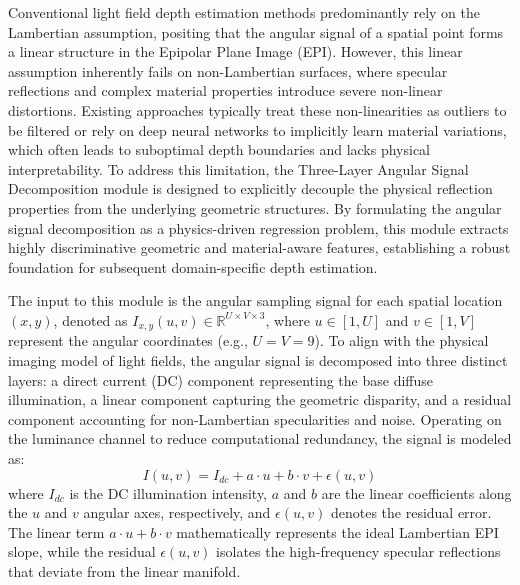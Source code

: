 \documentclass[lettersize,journal]{IEEEtran}
\begin{document}
Conventional light field depth estimation methods predominantly rely on the Lambertian assumption, positing that the angular signal of a spatial point forms a linear structure in the Epipolar Plane Image (EPI). However, this linear assumption inherently fails on non-Lambertian surfaces, where specular reflections and complex material properties introduce severe non-linear distortions. Existing approaches typically treat these non-linearities as outliers to be filtered or rely on deep neural networks to implicitly learn material variations, which often leads to suboptimal depth boundaries and lacks physical interpretability. To address this limitation, the Three-Layer Angular Signal Decomposition module is designed to explicitly decouple the physical reflection properties from the underlying geometric structures. By formulating the angular signal decomposition as a physics-driven regression problem, this module extracts highly discriminative geometric and material-aware features, establishing a robust foundation for subsequent domain-specific depth estimation.

The input to this module is the angular sampling signal for each spatial location $(x,y)$, denoted as $I_{x,y}(u,v) \in \mathbb{R}^{U \times V \times 3}$, where $u \in [1, U]$ and $v \in [1, V]$ represent the angular coordinates (e.g., $U=V=9$). To align with the physical imaging model of light fields, the angular signal is decomposed into three distinct layers: a direct current (DC) component representing the base diffuse illumination, a linear component capturing the geometric disparity, and a residual component accounting for non-Lambertian specularities and noise. Operating on the luminance channel to reduce computational redundancy, the signal is modeled as:
\begin{equation}
I(u,v) = I_{dc} + a \cdot u + b \cdot v + \epsilon(u,v)
\end{equation}
where $I_{dc}$ is the DC illumination intensity, $a$ and $b$ are the linear coefficients along the $u$ and $v$ angular axes, respectively, and $\epsilon(u,v)$ denotes the residual error. The linear term $a \cdot u + b \cdot v$ mathematically represents the ideal Lambertian EPI slope, while the residual $\epsilon(u,v)$ isolates the high-frequency specular reflections that deviate from the linear manifold.
\end{document}

